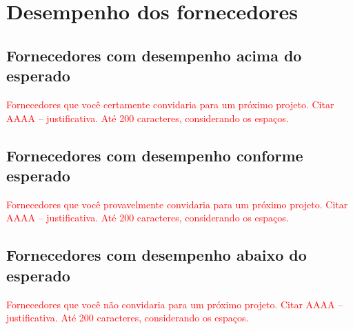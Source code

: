 \section{Desempenho dos fornecedores}

\subsection{Fornecedores com desempenho acima do esperado}
\textcolor{red}{Fornecedores que você certamente convidaria para um próximo projeto. Citar AAAA – justificativa. Até 200 caracteres, considerando os espaços.}

\subsection{Fornecedores com desempenho conforme esperado}
\textcolor{red}{Fornecedores que você provavelmente convidaria para um próximo projeto. Citar AAAA – justificativa. Até 200 caracteres, considerando os espaços.}

\subsection{Fornecedores com desempenho abaixo do esperado}
\textcolor{red}{Fornecedores que você não convidaria para um próximo projeto. Citar AAAA – justificativa. Até 200 caracteres, considerando os espaços.}